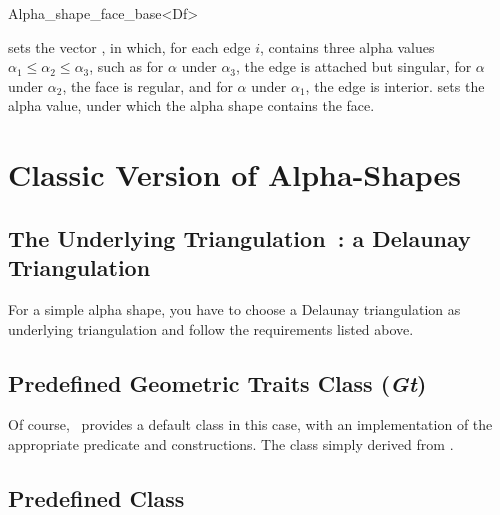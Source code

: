 \begin{ccClass}{Alpha_shape_face_base<Df>}
\ccModifiers

\begin{ccAdvanced}

{sets the vector , in which, for each edge $i$,  contains three
alpha values
 $\alpha_1 \leq \alpha_2 \leq \alpha_3$, such as for
$\alpha$ under $\alpha_3$, the edge is attached but singular,
for $\alpha$ under $\alpha_2$, the face is regular, and for $\alpha$
under $\alpha_1$, the edge is interior.}
{sets the alpha value, under which the alpha shape contains the
face.}

\end{ccAdvanced}

\end{ccClass}


\section{Classic Version of Alpha-Shapes\label{I1_SectClassicAS}}

\subsection*{The Underlying Triangulation~: a Delaunay Triangulation}

For a simple alpha shape, you have to choose a Delaunay triangulation as
underlying triangulation  and follow the requirements listed above.


\subsection*{Predefined Geometric Traits Class (\mbox{\it Gt})}

Of course, \cgal\ provides a default  class in this
case, with an implementation of the appropriate predicate and constructions.
The class  simply derived from 
.


\subsection*{Predefined \protect {} Class}

